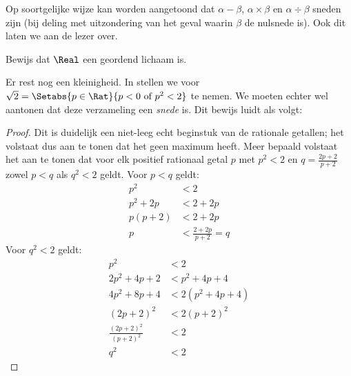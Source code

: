 \documentclass[openany]{memoir}
\begin{document}
Op soortgelijke wijze kan worden aangetoond dat $\alpha - \beta$,
$\alpha \times \beta$ en $\alpha \div \beta$ sneden zijn (bij deling
met uitzondering van het geval waarin $\beta$ de nulsnede is). Ook
dit laten we aan de lezer over.
\begin{prob}
Bewijs dat $\Real$ een geordend lichaam is.
\end{prob}
Er rest nog een kleinigheid. In  stellen we voor
$\sqrt{2} = \Setabs{p \in \Rat}{p < 0 \text{ of }p^2 < 2}$ te nemen.
We moeten echter wel aantonen dat deze verzameling een \emph{snede}
is. Dit bewijs luidt als volgt:
\begin{proof}
Dit is duidelijk een niet-leeg echt beginstuk van de rationale
getallen; het volstaat dus aan te tonen dat het geen maximum heeft.
Meer bepaald volstaat het aan te tonen dat voor elk positief
rationaal getal $p$ met $p^2 < 2$ en $q = \frac{2p+2}{p+2}$ zowel $p
< q$ als $q^2 < 2$ geldt. Voor $p < q$ geldt:
\begin{align*}
	p^2 &< 2\\
	p^2 + 2p &< 2 + 2p\\
	p(p + 2) &< 2 + 2p\\
	p &< \tfrac{2+2p}{p+2} = q
\end{align*}
Voor $q^2 < 2$ geldt:
\begin{align*}
	p^2 &< 2\\
	2p^2 + 4p + 2 &< p^2 + 4p+ 4\\
	4p^2 + 8p + 4 &< 2(p^2 + 4p + 4)\\
	(2p+2)^2 & <2(p+2)^2\\
	\tfrac{(2p+2)^2}{(p+2)^2} &< 2\\
	q^2 &< 2
\end{align*}
\end{proof}
\endgroup

\begingroup
\def\olfilename{OLP-0048}
\def\olfilepath{content/sets-functions-relations/arithmetization/}
\hypertarget{unit-OLP-0048}{}
\end{document}
